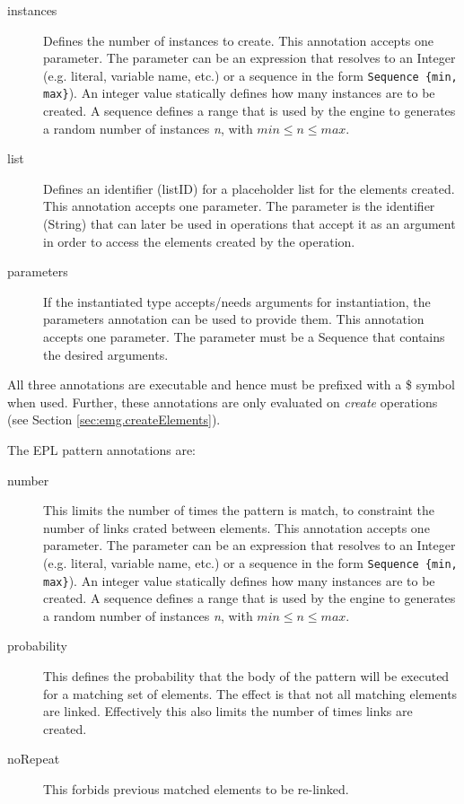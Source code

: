 \begin{description}
    \item[instances] Defines the number of instances to create. This annotation accepts one parameter. The parameter can be an expression that resolves to an Integer (e.g. literal, variable name, etc.)  or a sequence in the form \texttt{Sequence \{min, max\}}). An integer value statically defines how many instances are to be created. A sequence defines a range that is used by the engine to generates a random number of instances \emph{n}, with $min \le n \le max$.
    \item[list] Defines an identifier (listID) for a placeholder list for the elements created. This annotation accepts one parameter. The parameter is the identifier (String) that can later be used in operations that accept it as an argument in order to access the elements created by the operation. 
    \item[parameters] If the instantiated type accepts/needs arguments for instantiation, the parameters annotation can be used to provide them. This annotation accepts one parameter. The parameter must be a Sequence that contains the desired arguments. 
\end{description}

All three annotations are executable and hence must be prefixed with a \$ symbol when used. Further, these annotations are only evaluated on \emph{create} operations (see Section \ref{sec:emg.createElements}). 

The EPL pattern annotations are:

\begin{description}
    \item[number] This limits the number of times the pattern is match, to constraint the number of links crated between elements. This annotation accepts one parameter. The parameter can be an expression that resolves to an Integer (e.g. literal, variable name, etc.)  or a sequence in the form \texttt{Sequence \{min, max\}}). An integer value statically defines how many instances are to be created. A sequence defines a range that is used by the engine to generates a random number of instances \emph{n}, with $min \le n \le max$.
    \item[probability] This defines the probability that the body of the pattern will be executed for a matching set of elements. The effect is that not all matching elements are linked. Effectively this also limits the number of times links are created.  
    \item[noRepeat] This forbids previous matched elements to be re-linked. 
\end{description}

